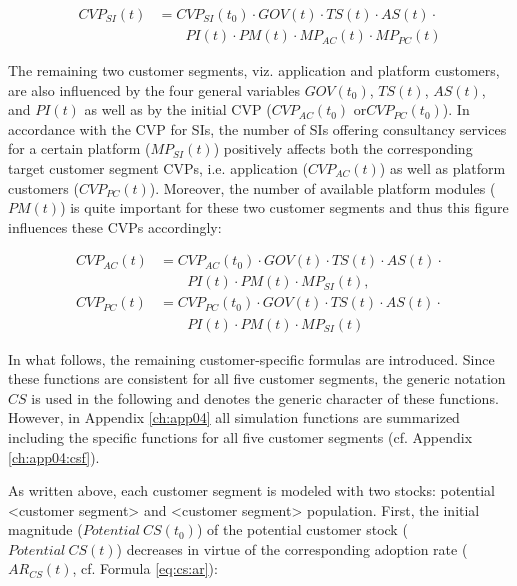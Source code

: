 \begin{align}
		CVP_{SI}(t) &= CVP_{SI}(t_0) \cdot GOV(t) \cdot TS(t) \cdot AS(t) \cdot \nonumber \\ &\qquad PI(t) \cdot PM(t) \cdot MP_{AC}(t) \cdot MP_{PC}(t)\label{eq:cvp:si}
\end{align}

The remaining two customer segments, viz. application and platform customers, are also influenced by the four general variables $GOV(t_0)$, $TS(t)$, $AS(t)$, and $PI(t)$ as well as by the initial \ac{CVP} ($CVP_{AC}(t_0)$ or\linebreak $CVP_{PC}(t_0)$). In accordance with the \ac{CVP} for \acp{SI}, the number of \acp{SI} offering consultancy services for a certain platform ($MP_{SI}(t)$) positively affects both the corresponding target customer segment \acp{CVP}, i.e. application ($CVP_{AC}(t)$) as well as platform customers ($CVP_{PC}(t)$). Moreover, the number of available platform modules ($PM(t)$) is quite important for these two customer segments and thus this figure influences these \acp{CVP} accordingly:

\begin{align}
		CVP_{AC}(t) &= CVP_{AC}(t_0) \cdot GOV(t) \cdot TS(t) \cdot AS(t) \cdot \nonumber \\ &\qquad PI(t) \cdot PM(t) \cdot MP_{SI}(t),\label{eq:cvp:ac}\\
		CVP_ {PC}(t) &= CVP_{PC}(t_0) \cdot GOV(t) \cdot TS(t) \cdot AS(t) \cdot \nonumber \\ &\qquad PI(t) \cdot PM(t) \cdot MP_{SI}(t)\label{eq:cvp:pc}
\end{align}

In what follows, the remaining customer-specific formulas are introduced. Since these functions are consistent for all five customer segments, the generic notation $CS$ is used in the following and denotes the generic character of these functions. However, in Appendix \ref{ch:app04} all simulation functions are summarized including the specific functions for all five customer segments (cf. Appendix \ref{ch:app04:csf}).

As written above, each customer segment is modeled with two stocks: potential <customer segment> and <customer segment> population. First, the initial magnitude ($\mathit{Potential~CS(t_0)}$) of the potential customer stock \linebreak ($\mathit{Potential~CS(t)}$) decreases in virtue of the corresponding adoption rate \linebreak ($AR_{CS}(t)$, cf. Formula \ref{eq:cs:ar}):

